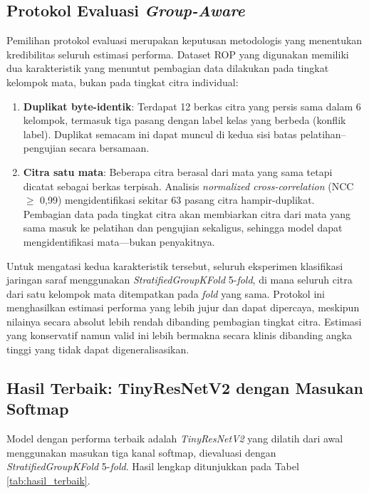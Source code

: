\subsection{Protokol Evaluasi \textit{Group-Aware}}
\label{subsec:group_aware}

Pemilihan protokol evaluasi merupakan keputusan metodologis yang menentukan kredibilitas
seluruh estimasi performa. Dataset ROP yang digunakan memiliki dua karakteristik yang
menuntut pembagian data dilakukan pada tingkat kelompok mata, bukan pada tingkat citra
individual:

\begin{enumerate}
    \item \textbf{Duplikat byte-identik}: Terdapat 12 berkas citra yang persis sama dalam 6
    kelompok, termasuk tiga pasang dengan label kelas yang berbeda (konflik label). Duplikat
    semacam ini dapat muncul di kedua sisi batas pelatihan--pengujian secara bersamaan.
    \item \textbf{Citra satu mata}: Beberapa citra berasal dari mata yang sama tetapi dicatat
    sebagai berkas terpisah. Analisis \textit{normalized cross-correlation} (NCC $\geq$ 0,99)
    mengidentifikasi sekitar 63 pasang citra hampir-duplikat. Pembagian data pada tingkat citra
    akan membiarkan citra dari mata yang sama masuk ke pelatihan dan pengujian sekaligus,
    sehingga model dapat mengidentifikasi mata---bukan penyakitnya.
\end{enumerate}

Untuk mengatasi kedua karakteristik tersebut, seluruh eksperimen klasifikasi jaringan saraf
menggunakan \textit{StratifiedGroupKFold} 5-\textit{fold}, di mana seluruh citra dari satu
kelompok mata ditempatkan pada \textit{fold} yang sama. Protokol ini menghasilkan estimasi
performa yang lebih jujur dan dapat dipercaya, meskipun nilainya secara absolut lebih rendah
dibanding pembagian tingkat citra. Estimasi yang konservatif namun valid
ini lebih bermakna secara klinis dibanding angka tinggi yang tidak dapat digeneralisasikan.

\subsection{Hasil Terbaik: TinyResNetV2 dengan Masukan Softmap}

Model dengan performa terbaik adalah \textit{TinyResNetV2} yang dilatih dari awal menggunakan
masukan tiga kanal softmap, dievaluasi dengan \textit{StratifiedGroupKFold} 5-\textit{fold}.
Hasil lengkap ditunjukkan pada Tabel \ref{tab:hasil_terbaik}.

